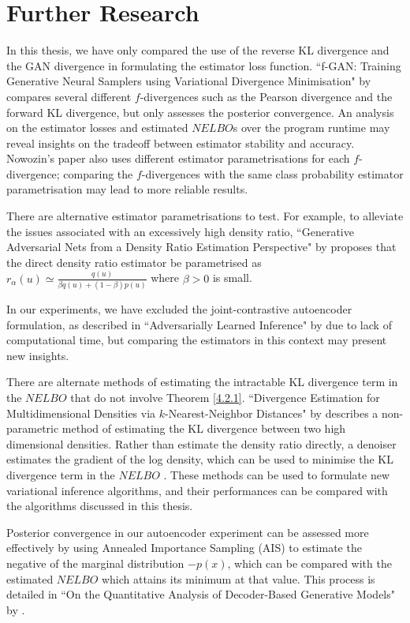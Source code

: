 \documentclass[honours,12pt]{unswthesis}
\numberwithin{equation}{section}
\theoremstyle{definition}
\begin{document}
\section{Further Research}
In this thesis, we have only compared the use of the reverse KL divergence and the GAN divergence in formulating the estimator loss function. ``f-GAN: Training Generative Neural Samplers using Variational Divergence Minimisation" by \citet{nowozin} compares several different $f$-divergences such as the Pearson divergence and the forward KL divergence, but only assesses the posterior convergence. An analysis on the estimator losses and estimated $NELBO$s over the program runtime may reveal insights on the tradeoff between estimator stability and accuracy. Nowozin's paper also uses different estimator parametrisations for each $f$-divergence; comparing the $f$-divergences with the same class probability estimator parametrisation may lead to more reliable results.

There are alternative estimator parametrisations to test. For example, to alleviate the issues associated with an excessively high density ratio, ``Generative Adversarial Nets from a Density Ratio Estimation Perspective" by \citet{bgan} proposes that the direct density ratio estimator be parametrised as $r_\alpha(u)\simeq \frac{q(u)}{\beta q(u)+(1-\beta)p(u)}$ where $\beta>0$ is small.

In our experiments, we have excluded the joint-contrastive autoencoder formulation, as described in ``Adversarially Learned Inference" by \citet{ali} due to lack of computational time, but comparing the estimators in this context may present new insights.

There are alternate methods of estimating the intractable KL divergence term in the $NELBO$ that do not involve Theorem \ref{4.2.1}. ``Divergence Estimation for Multidimensional Densities via $k$-Nearest-Neighbor Distances" by \citet{wang} describes a non-parametric method of estimating the KL divergence between two high dimensional densities. Rather than estimate the density ratio directly, a denoiser estimates the gradient of the log density, which can be used to minimise the KL divergence term in the $NELBO$ \citep{vincent}. These methods can be used to formulate new variational inference algorithms, and their performances can be compared with the algorithms discussed in this thesis.

Posterior convergence in our autoencoder experiment can be assessed more effectively by using Annealed Importance Sampling (AIS) to estimate the negative of the marginal distribution $-p(x)$, which can be compared with the estimated $NELBO$ which attains its minimum at that value. This process is detailed in ``On the Quantitative Analysis of Decoder-Based Generative Models" by \citet{ais}.
\end{document}

